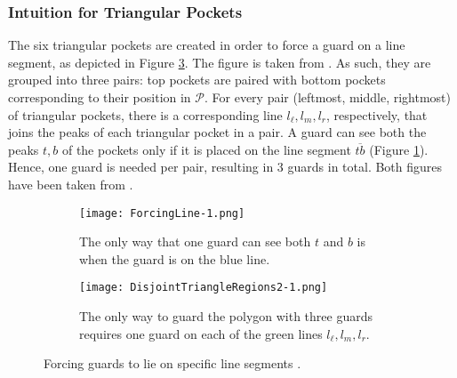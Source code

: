 \subsubsection{Intuition for Triangular Pockets}
The six triangular pockets are created in order to force a guard on a line segment, as depicted in Figure \ref{fig:tb}. The figure is taken from \cite{abrahamsen2021art}. As such, they are grouped into three pairs: top pockets are paired with bottom pockets corresponding to their position in $\mathcal P$. For every pair (leftmost, middle, rightmost) of triangular pockets, there is a corresponding line $l_\ell, l_m, l_r$, respectively, that joins the peaks of each triangular pocket in a pair. A guard can see both the peaks $t, b$ of the pockets only if it is placed on the line segment $\overline{tb}$ (Figure \ref{fig:forcing_line}). Hence, one guard is needed per pair, resulting in 3 guards in total. Both figures have been taken from \cite{1057165}.

\begin{figure}[h!]
    \centering
    \begin{subfigure}{0.3\textwidth}
        \centering
        \texttt{[image: ForcingLine-1.png]}
        \caption{The only way that one guard can see both $t$ and $b$ is when the guard is on the blue line.}
        \label{fig:forcing_line}
    \end{subfigure}
    \hfill
    \begin{subfigure}{0.65\textwidth}
        \centering
        \texttt{[image: DisjointTriangleRegions2-1.png]}
        \caption{The only way to guard the polygon with three guards requires one guard on each of the green lines $l_\ell, l_m, l_r$.}
        \label{fig:disjoint_triangle}
    \end{subfigure}
    \caption{Forcing guards to lie on specific line segments \cite{1057165}.}
    \label{fig:tb}
\end{figure}

